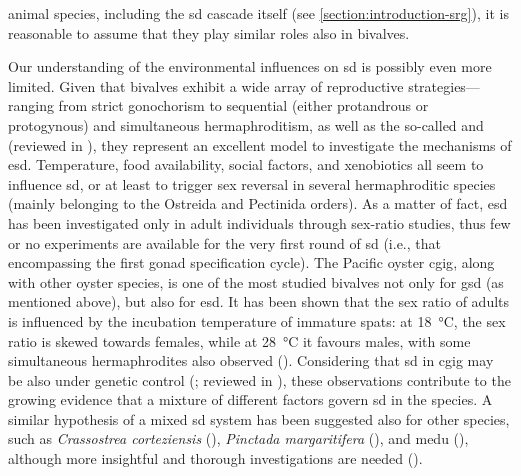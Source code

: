 animal species, including the \gls{sd} cascade itself (see \cref{section:introduction-srg}), it is reasonable to assume that they play similar roles also in bivalves.

Our understanding of the environmental influences on \gls{sd} is possibly even more limited. Given that bivalves exhibit a wide array of reproductive strategies—ranging from strict gonochorism to sequential (either protandrous or protogynous) and simultaneous hermaphroditism, as well as the so-called  and  (reviewed in ), they represent an excellent model to investigate the mechanisms of \gls{esd}. Temperature, food availability, social factors, and xenobiotics all seem to influence \gls{sd}, or at least to trigger sex reversal in several hermaphroditic species (mainly belonging to the Ostreida and Pectinida orders). As a matter of fact, \gls{esd} has been investigated only in adult individuals through sex-ratio studies, thus few or no experiments are available for the very first round of \gls{sd} (i.e., that encompassing the first gonad specification cycle). The Pacific oyster \gls{cgig}, along with other oyster species, is one of the most studied bivalves not only for \gls{gsd} (as mentioned above), but also for \gls{esd}. It has been shown that the sex ratio of adults is influenced by the incubation temperature of immature spats: at \qty{18}{\degreeCelsius}, the sex ratio is skewed towards females, while at \qty{28}{\degreeCelsius} it favours males, with some simultaneous hermaphrodites also observed (). Considering that \gls{sd} in \gls{cgig} may be also under genetic control (; reviewed in ), these observations contribute to the growing evidence that a mixture of different factors govern \gls{sd} in the species. A similar hypothesis of a mixed \gls{sd} system has been suggested also for other species, such as \textit{Crassostrea corteziensis} (), \textit{Pinctada margaritifera} (), and \gls{medu} (), although more insightful and thorough investigations are needed ().

